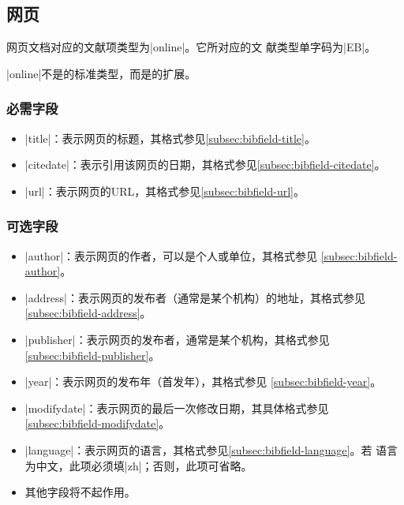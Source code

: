

\subsection{网页}\label{subsec:bibtype-online}

网页文档对应的{\BibTeX}文献项类型为|online|。它所对应的文
献类型\cite{gbt3469-1983}单字码为|EB|。

|online|不是{\BibTeX}的标准类型，而是{\njuthesis}的扩展。

\subsubsection{必需字段}

\begin{itemize}
\item |title|：表示网页的标题，其格式参见\ref{subsec:bibfield-title}。
\item |citedate|：表示引用该网页的日期，其格式参见\ref{subsec:bibfield-citedate}。
\item |url|：表示网页的URL，其格式参见\ref{subsec:bibfield-url}。
\end{itemize}

\subsubsection{可选字段}

\begin{itemize}
\item |author|：表示网页的作者，可以是个人或单位，其格式参见
  \ref{subsec:bibfield-author}。
\item |address|：表示网页的发布者（通常是某个机构）的地址，其格式参见
  \ref{subsec:bibfield-address}。
\item |publisher|：表示网页的发布者，通常是某个机构，其格式参见
  \ref{subsec:bibfield-publisher}。
\item |year|：表示网页的发布年（首发年），其格式参见
  \ref{subsec:bibfield-year}。
\item |modifydate|：表示网页的最后一次修改日期，其具体格式参见
  \ref{subsec:bibfield-modifydate}。
\item |language|：表示网页的语言，其格式参见\ref{subsec:bibfield-language}。若
  语言为中文，此项必须填|zh|；否则，此项可省略。
\item 其他字段将不起作用。
\end{itemize}

